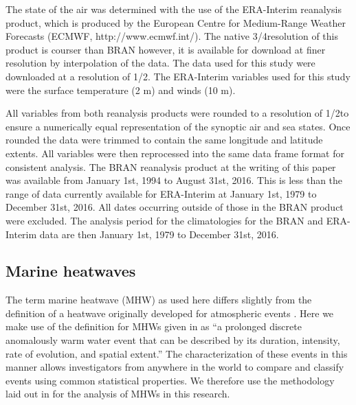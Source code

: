 \documentclass[a4paper,10pt,review]{elsarticle}
\begin{document}
The state of the air was determined with the use of the ERA-Interim reanalysis product, which is produced by the European Centre for Medium-Range Weather Forecasts (ECMWF, http://www.ecmwf.int/). The native 3/4\degree resolution of this product is courser than BRAN however, it is available for download at finer resolution by interpolation of the data. The data used for this study were downloaded at a resolution of 1/2\degree. The ERA-Interim variables used for this study were the surface temperature (2 m) and winds (10 m). 

All variables from both reanalysis products were rounded to a resolution of 1/2\degree to ensure a numerically equal representation of the synoptic air and sea states. Once rounded the data were trimmed to contain the same longitude and latitude extents. All variables were then reprocessed into the same data frame format for consistent analysis. The BRAN reanalysis product at the writing of this paper was available from January 1st, 1994 to August 31st, 2016. This is less than the range of data currently available for ERA-Interim at January 1st, 1979 to December 31st, 2016. All dates occurring outside of those in the BRAN product were excluded. The analysis period for the climatologies for the BRAN and ERA-Interim data are then January 1st, 1979 to December 31st, 2016.

\subsection{Marine heatwaves}
The term marine heatwave (MHW) as used here differs slightly from the definition of a heatwave originally developed for atmospheric events \citep{Perkins2013}. Here we make use of the definition for MHWs given in \citet{Hobday2016} as ``a prolonged discrete anomalously warm water event that can be described by its duration, intensity, rate of evolution, and spatial extent.'' The characterization of these events in this manner allows investigators from anywhere in the world to compare and classify events using common statistical properties. We therefore use the methodology laid out in \citet{Hobday2016} for the analysis of MHWs in this research.
\end{document}
